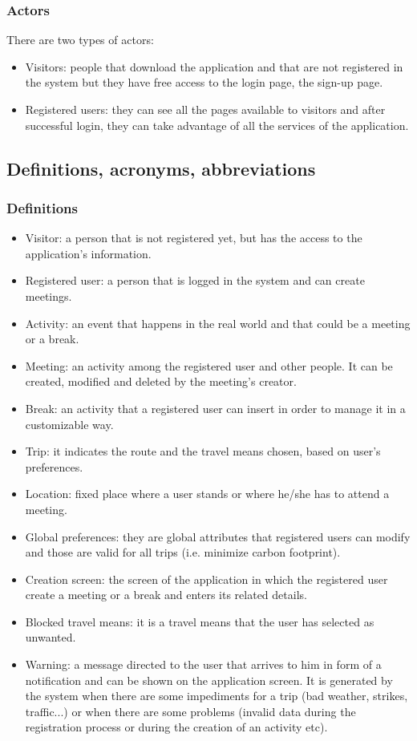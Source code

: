 \documentclass[12pt,titlepage]{article}
\begin{document}
\subsubsection{Actors}\label{RASD}
There are two types of actors:
\begin{itemize}
\item Visitors: people that download the application and that are not registered in the system but they have free access to the login page, the sign-up page.
\item Registered users: they can see all the pages available to visitors and after successful login, they can take advantage of all the services of the application.

\end{itemize}


\subsection{Definitions, acronyms, abbreviations}\label{RASD}
\subsubsection{Definitions}\label{RASD}
\begin{itemize}
\item Visitor: a person that is not registered yet, but has the access to the application's information. 
\item	Registered user: a person that is logged in the system and can create meetings.
\item	Activity: an event that happens in the real world and that could be a meeting or a break.
\item	Meeting: an activity among the registered user and other people. It can be created, modified and deleted by the meeting's creator. 
\item	Break: an activity that a registered user can insert in order to manage it in a customizable way.
\item Trip: it indicates the route and the travel means chosen, based on user's preferences.
\item Location: fixed place where a user stands or where he/she has to attend a meeting. 
\item Global preferences: they are global attributes that registered users can modify and those are valid for all trips (i.e. minimize carbon footprint).
\item	Creation screen: the screen of the application in which the registered user create a meeting or a break and enters its related details.
\item Blocked travel means: it is a travel means that the user has selected as unwanted.
\item Warning: a message directed to the user that arrives to him in form of a notification and can be shown on the application screen. It is generated by the system when there are some impediments for a trip (bad weather, strikes, traffic...) or when there are some problems (invalid data during the registration process or during the creation of an activity etc).
\end{itemize}
\end{document}
